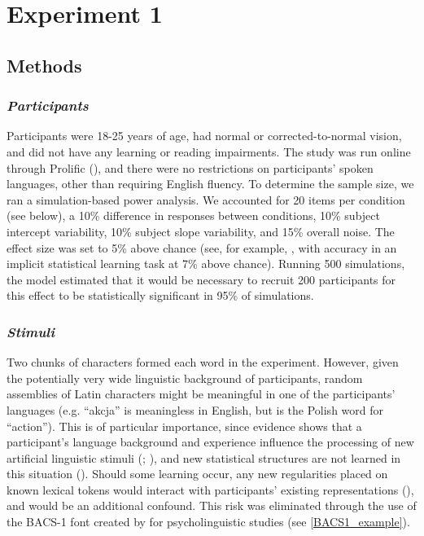 \section{Experiment 1}
\label{Exp1}

\subsection{Methods}
\label{Methods1}
\subsubsection{\large{\emph{Participants}}}
\label{Participants1}

\noindent
Participants were 18-25 years of age, had normal or corrected-to-normal vision, and did not have any learning or reading impairments. The study was run online through Prolific (\cite{Prolific}), and there were no restrictions on participants' spoken languages, other than requiring English fluency. To determine the sample size, we ran a simulation-based power analysis. We accounted for 20 items per condition (see below), a 10\% difference in responses between conditions, 10\% subject intercept variability, 10\% subject slope variability, and 15\% overall noise. The effect size was set to 5\% above chance (see, for example, \textcite{Onnis2018}, with accuracy in an implicit statistical learning task at 7\% above chance). Running 500 simulations, the model estimated that it would be necessary to recruit 200 participants for this effect to be statistically significant in 95\% of simulations.

\subsubsection{\large{\emph{Stimuli}}}
\label{Stimuli1}

\noindent %
Two chunks of characters formed each word in the experiment. However, given the potentially very wide linguistic background of participants, random assemblies of Latin characters might be meaningful in one of the participants' languages (e.g. ``akcja'' is meaningless in English, but is the Polish word for ``action''). This is of particular importance, since evidence shows that a participant's language background and experience influence the processing of new artificial linguistic stimuli (\cite{Siegelman2018}; \cite{Weiss2020}), and new statistical structures are not learned in this situation (\cite{Lelonkiewicz2022}). Should some learning occur, any new regularities placed on known lexical tokens would interact with participants' existing representations (\cite{Frost2019}), and would be an additional confound. This risk was eliminated through the use of the BACS-1 font created by \textcite{Vidal2017} for psycholinguistic studies (see \autoref{BACS1_example}).

